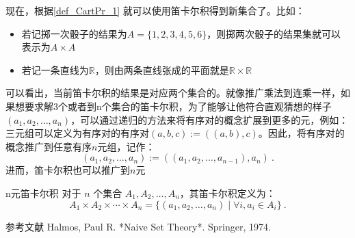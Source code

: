 现在，根据\autoref{def_CartPr_1} 就可以使用笛卡尔积得到新集合了。比如：
\begin{itemize}
\item 若记掷一次骰子的结果为$A=\{1, 2, 3, 4, 5, 6\}$，则掷两次骰子的结果集就可以表示为$A\times A$
\item 若记一条直线为${\mathbb R}$，则由两条直线张成的平面就是${\mathbb R}\times{\mathbb R}$
\end{itemize}
可以看出，当前笛卡尔积的结果是对应两个集合的。就像推广乘法到连乘一样，如果想要求解3个或者到n个集合的笛卡尔积，为了能够让他符合直观猜想的样子$(a_1, a_2, \ldots, a_n)$，可以通过递归的方法来将有序对的概念扩展到更多的元，例如：三元组可以定义为有序对的有序对$(a, b, c) := ((a, b), c)$。因此，将有序对的概念推广到任意有序$n$元组，记作：
\begin{equation}
(a_1, a_2, \ldots, a_n) := ((a_1, a_2, \ldots, a_{n-1}), a_n)~.
\end{equation}
进而，笛卡尔积也可以推广到$n$元
\begin{definition}{n元笛卡尔积}
对于 $n$ 个集合 $A_1, A_2, \ldots, A_n$，其笛卡尔积定义为：
\begin{equation}
A_1 \times A_2 \times \cdots \times A_n = \{(a_1, a_2, \ldots, a_n) \mid \forall i,a_i \in A_i \} ~.
\end{equation}
\end{definition}

参考文献
Halmos, Paul R. *Naive Set Theory*. Springer, 1974.
